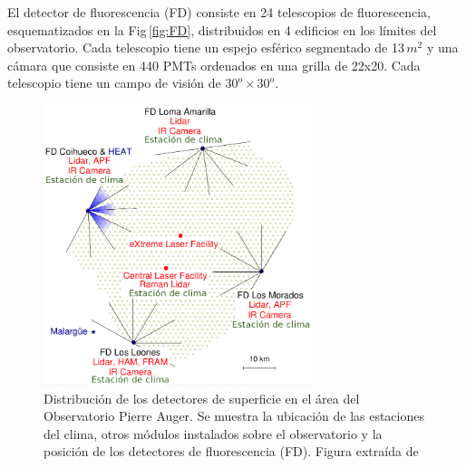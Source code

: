 El detector de fluorescencia (FD) consiste en 24 telescopios de fluorescencia, esquematizados en la Fig\,\ref{fig:FD}, distribuidos en 4 edificios en los límites del observatorio. Cada telescopio tiene un espejo esférico segmentado de 13$\,m^2$ y una cámara que consiste en 440 PMTs ordenados en una grilla de 22x20. Cada telescopio tiene un campo de visión de $30^o\times30^o$.

\begin{figure}[H]
	\centering
	\includegraphics[width=0.7\textwidth]{auger_sd.png}
	\caption{Distribución de los detectores de superficie en el área del Observatorio Pierre Auger. Se muestra la ubicación de las estaciones del clima, otros módulos instalados sobre el observatorio y la posición de los detectores de fluorescencia (FD). Figura extraída de \cite{como_funciona_auger}}
	\label{fig:auger_sd}
\end{figure}
